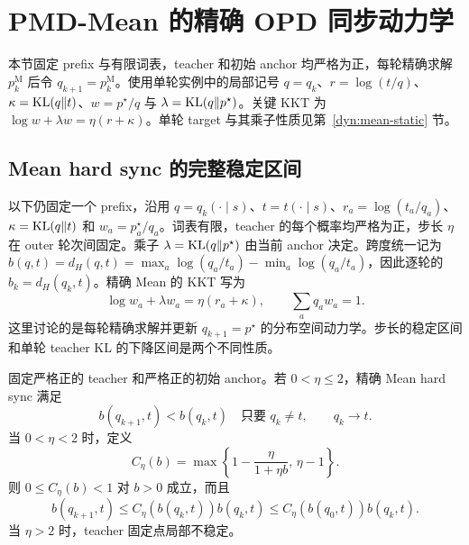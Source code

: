 \section{PMD-Mean 的精确 OPD 同步动力学}
\label{dyn:mean-dynamics}

本节固定 prefix 与有限词表，teacher 和初始 anchor 均严格为正，每轮精确求解 $p_k^{\mathrm M}$ 后令 $q_{k+1}=p_k^{\mathrm M}$。使用单轮实例中的局部记号 $q=q_k$、$r=\log(t/q)$、$\kappa=\operatorname{KL}(q\Vert t)$、$w=p^\star/q$ 与 $\lambda=\operatorname{KL}(q\Vert p^\star)$。关键 KKT 为 $\log w+\lambda w=\eta(r+\kappa)$。单轮 target 与其乘子性质见第~\ref{dyn:mean-static} 节。

\subsection{Mean hard sync 的完整稳定区间}
\label{dyn:sec:mean-hard-sync-stability}

以下仍固定一个 prefix，沿用 $q=q_k(\cdot\mid s)$、$t=t(\cdot\mid s)$、$r_a=\log(t_a/q_a)$、$\kappa=\operatorname{KL}(q\Vert t)$ 和 $w_a=p_a^\star/q_a$。词表有限，teacher 的每个概率均严格为正，步长 $\eta$ 在 outer 轮次间固定。乘子 $\lambda=\operatorname{KL}(q\Vert p^\star)$ 由当前 anchor 决定。跨度统一记为 $b(q,t)=d_H(q,t)=\max_a\log(q_a/t_a)-\min_a\log(q_a/t_a)$，因此逐轮的 $b_k=d_H(q_k,t)$。精确 Mean 的 KKT 写为
\begin{equation}
 \log w_a+\lambda w_a=\eta(r_a+\kappa),
 \qquad \sum_aq_aw_a=1.
 \label{dyn:eq:mean-hard-sync-kkt}
\end{equation}
这里讨论的是每轮精确求解并更新 $q_{k+1}=p^\star$ 的分布空间动力学。步长的稳定区间和单轮 teacher KL 的下降区间是两个不同性质。

\begin{theorem}
\label{dyn:thm:mean-hard-sync-full-stability}
固定严格正的 teacher 和严格正的初始 anchor。若 $0<\eta\le2$，精确 Mean hard sync 满足
\begin{equation*}
 b(q_{k+1},t)<b(q_k,t)
 \quad\text{只要 }q_k\ne t,
 \qquad q_k\longrightarrow t.
\end{equation*}
当 $0<\eta<2$ 时，定义
\begin{equation}
 C_\eta(b)=\max\left\{1-\frac{\eta}{1+\eta b},\,\eta-1\right\}.
 \label{dyn:eq:mean-hard-sync-contraction-factor}
\end{equation}
则 $0\le C_\eta(b)<1$ 对 $b>0$ 成立，而且
\begin{equation}
 b(q_{k+1},t)\le C_\eta(b(q_k,t))b(q_k,t)
 \le C_\eta(b(q_0,t))b(q_k,t).
 \label{dyn:eq:mean-hard-sync-stability-geometric}
\end{equation}
当 $\eta>2$ 时，teacher 固定点局部不稳定。
\end{theorem}

